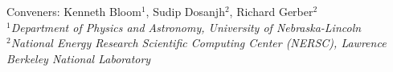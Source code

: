 

\begin{center}
{\large Conveners: Kenneth Bloom$^1$,  Sudip Dosanjh$^2$, Richard Gerber$^2$}\\
\bigskip
$^1${\it Department of Physics and Astronomy, University of Nebraska-Lincoln}\\
$^2${\it National Energy Research Scientific Computing Center (NERSC), Lawrence Berkeley National Laboratory}\\
\end{center}


